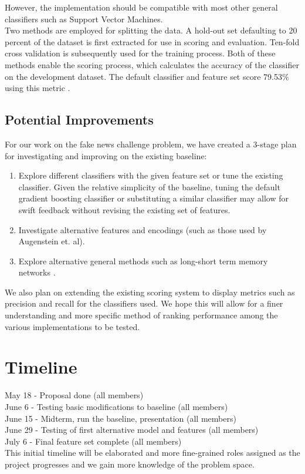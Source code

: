\documentclass[11pt,a4paper]{article}
\begin{document}
However, the implementation should be compatible with most other general classifiers such as Support Vector Machines.  \\

Two methods are employed for splitting the data. A hold-out set defaulting to 20 percent of the dataset is first extracted for use in scoring and evaluation. Ten-fold cross validation is subsequently used for the training process. Both of these methods enable the scoring process, which calculates the accuracy of the classifier on the development dataset. The default classifier and feature set score 79.53\% using this metric \cite{fncbaselinegithub}.


\subsection{Potential Improvements} 

For our work on the fake news challenge problem, we have created a 3-stage plan for investigating and improving on the existing baseline:

\begin{enumerate}
	\item Explore different classifiers with the given feature set or tune the existing classifier. Given the relative simplicity of the baseline, tuning the default gradient boosting classifier or substituting a similar classifier may allow for swift feedback without revising the existing set of features.
	\item Investigate alternative features and encodings (such as those used by Augenstein et. al). 
	\item Explore alternative general methods such as long-short term memory networks \cite{augenstein2016stance}. 
\end{enumerate}

We also plan on extending the existing scoring system to display metrics such as precision and recall for the classifiers used. We hope this will allow for a finer understanding and more specific method of ranking performance among the various implementations to be tested.

\section{Timeline}
May 18 - Proposal done (all members) \\
June 6 - Testing basic modifications to baseline (all members) \\
June 15 - Midterm, run the baseline, presentation (all members) \\
June 29 - Testing of first alternative model and features (all members) \\
July 6 - Final feature set complete (all members) \\

This initial timeline will be elaborated and more fine-grained roles assigned as the project progresses and we gain more knowledge of the problem space.


%
%


\end{document}

